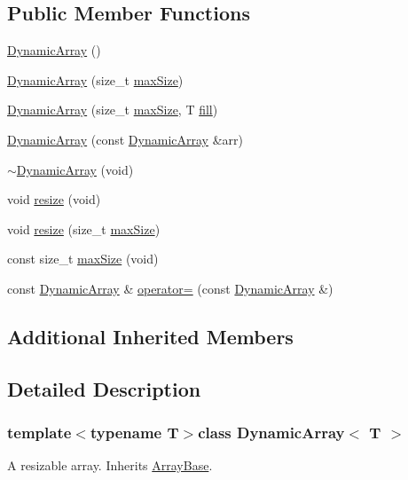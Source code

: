 \subsection*{Public Member Functions}
\begin{DoxyCompactItemize}
\item 
\hyperlink{a00002_a7d42e6eaa66bab7c43f193e78d2d56a9}{Dynamic\+Array} ()
\item 
\hyperlink{a00002_a2b4e0e5f2d4af1b1ec5e37bcf2b63e27}{Dynamic\+Array} (size\+\_\+t \hyperlink{a00002_aeb1916d4d9cf7db37df86cb7a603c198}{max\+Size})
\item 
\hyperlink{a00002_ad054824baa39e43dd319dad7edff0316}{Dynamic\+Array} (size\+\_\+t \hyperlink{a00002_aeb1916d4d9cf7db37df86cb7a603c198}{max\+Size}, T \hyperlink{a00001_a6becc5e91c79d7693c0d406e466f9ec6}{fill})
\item 
\hyperlink{a00002_ae6f8273691c6c3a9284e7455e6bea18d}{Dynamic\+Array} (const \hyperlink{a00002}{Dynamic\+Array} \&arr)
\item 
\hyperlink{a00002_a1ace6a2b9a5ed8890a840c400f41ce9a}{$\sim$\+Dynamic\+Array} (void)
\item 
void \hyperlink{a00002_a7d9f29d3efa102b7d8229bfc24b9d431}{resize} (void)
\item 
void \hyperlink{a00002_aee346fa4cd0db8d1f385ea82aa93f541}{resize} (size\+\_\+t \hyperlink{a00002_aeb1916d4d9cf7db37df86cb7a603c198}{max\+Size})
\item 
const size\+\_\+t \hyperlink{a00002_aeb1916d4d9cf7db37df86cb7a603c198}{max\+Size} (void)
\item 
const \hyperlink{a00002}{Dynamic\+Array} \& \hyperlink{a00002_a683eba7c0e4652c6b1baae93e1e6ca7b}{operator=} (const \hyperlink{a00002}{Dynamic\+Array} \&)
\end{DoxyCompactItemize}
\subsection*{Additional Inherited Members}


\subsection{Detailed Description}
\subsubsection*{template$<$typename T$>$class Dynamic\+Array$<$ T $>$}

A resizable array. Inherits \hyperlink{a00001}{Array\+Base}. 


